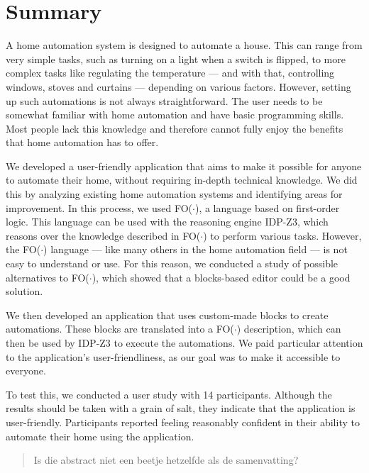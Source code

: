 \documentclass[11pt,a4paper]{report}
\newcommand{\fodot}{FO($\cdot$)\xspace}
\begin{document}
\section*{Summary}
A home automation system is designed to automate a house. This can range from very simple tasks, such as turning on a light when a switch is flipped, to more complex tasks like regulating the temperature — and with that, controlling windows, stoves and curtains — depending on various factors. However, setting up such automations is not always straightforward. The user needs to be somewhat familiar with home automation and have basic programming skills. Most people lack this knowledge and therefore cannot fully enjoy the benefits that home automation has to offer.

We developed a user-friendly application that aims to make it possible for anyone to automate their home, without requiring in-depth technical knowledge. We did this by analyzing existing home automation systems and identifying areas for improvement. In this process, we used \fodot, a language based on first-order logic. This language can be used with the reasoning engine IDP-Z3, which reasons over the knowledge described in \fodot to perform various tasks. However, the \fodot language — like many others in the home automation field — is not easy to understand or use. For this reason, we conducted a study of possible alternatives to \fodot, which showed that a blocks-based editor could be a good solution.

We then developed an application that uses custom-made blocks to create automations. These blocks are translated into a \fodot description, which can then be used by IDP-Z3 to execute the automations. We paid particular attention to the application's user-friendliness, as our goal was to make it accessible to everyone.

To test this, we conducted a user study with 14 participants. Although the results should be taken with a grain of salt, they indicate that the application is user-friendly. Participants reported feeling reasonably confident in their ability to automate their home using the application.

\begin{abstract}
    Is die abstract niet een beetje hetzelfde als de samenvatting?
\end{abstract}

\printnoidxglossary[type=\acronymtype]%
\clearpage

%
%
%
\end{document}
